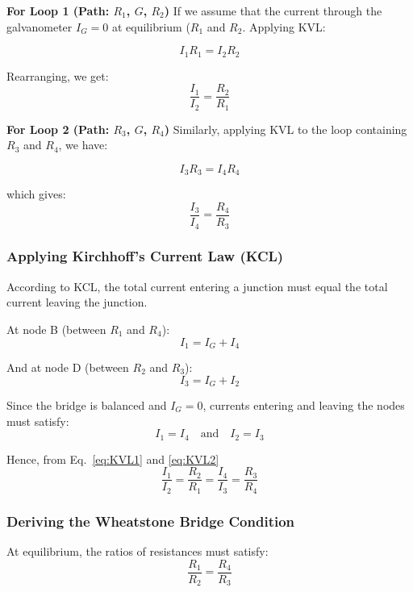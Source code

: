 \documentclass[journal]{IEEEtran}
\begin{document}
\textbf{For Loop 1 (Path: \( R_1 \), \( G \), \( R_2 \))}  
If we assume that the current through the galvanometer \( I_G = 0 \) at equilibrium (\( R_1 \) and \( R_2 \). Applying KVL:

\begin{equation}
    I_1 R_1 = I_2 R_2
\end{equation}

Rearranging, we get:
\begin{equation}
    \frac{I_1}{I_2} = \frac{R_2}{R_1}
    \label{eq:KVL1}
\end{equation}

\textbf{For Loop 2 (Path: \( R_3 \), \( G \), \( R_4 \))}
Similarly, applying KVL to the loop containing \( R_3 \) and \( R_4 \), we have:

\begin{equation}
    I_3 R_3 = I_4 R_4
\end{equation}

which gives:
\begin{equation}
    \frac{I_3}{I_4} = \frac{R_4}{R_3}
    \label{eq:KVL2}
\end{equation}

\subsubsection{Applying Kirchhoff's Current Law (KCL)}
According to KCL, the total current entering a junction must equal the total current leaving the junction.

At node B (between \( R_1 \) and \( R_4 \)):
\begin{equation}
    I_1 = I_G + I_4
\end{equation}

And at node D (between \( R_2 \) and \( R_3 \)):
\begin{equation}
    I_3 = I_G + I_2
\end{equation}

Since the bridge is balanced and \( I_G = 0 \), currents entering and leaving the nodes must satisfy:
\begin{equation}
    I_1 = I_4 \quad \text{and} \quad I_2 = I_3
\end{equation}

Hence, from Eq.~\ref{eq:KVL1} and \ref{eq:KVL2}
\begin{equation}
    \frac{I_1}{I_2} = \frac{R_2}{R_1} = \frac{I_4}{I_3} = \frac{R_3}{R_4}
\end{equation}

\subsubsection{ Deriving the Wheatstone Bridge Condition}
At equilibrium, the ratios of resistances must satisfy:
\begin{equation}
    \frac{R_1}{R_2} = \frac{R_4}{R_3}
\end{equation}
\end{document}
